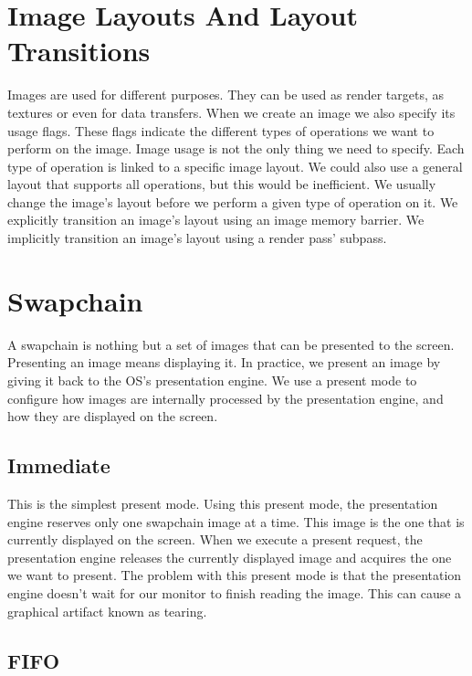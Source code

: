 \section{Image Layouts And Layout Transitions}

Images are used for different purposes.
They can be used as render targets, as textures or even for data transfers.
When we create an image we also specify its usage flags.
These flags indicate the different types of operations we want to perform
on the image.
Image usage is not the only thing we need to specify.
Each type of operation is linked to a specific image layout.
We could also use a general layout that supports all operations, but this
would be inefficient.
We usually change the image's layout before we perform a given type of
operation on it.
We explicitly transition an image's layout using an image memory barrier.
We implicitly transition an image's layout using a render pass' subpass.

\section{Swapchain}

A swapchain is nothing but a set of images that can be presented to the screen.
Presenting an image means displaying it.
In practice, we present an image by giving it back to the OS's presentation engine.
We use a present mode to configure how images are internally processed by
the presentation engine, and how they are displayed on the screen.

\subsection{Immediate}

This is the simplest present mode.
Using this present mode, the presentation engine reserves only one swapchain
image at a time.
This image is the one that is currently displayed on the screen.
When we execute a present request, the presentation engine releases
the currently displayed image and acquires the one we want to present.
The problem with this present mode is that the presentation engine doesn't
wait for our monitor to finish reading the image.
This can cause a graphical artifact known as tearing.

\subsection{FIFO}

